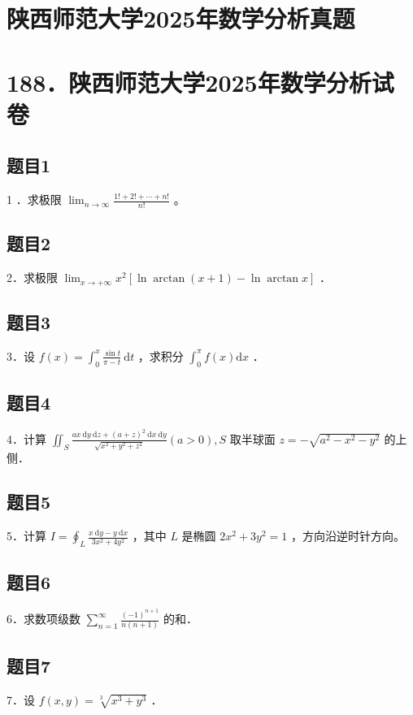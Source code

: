 \documentclass{article}
\begin{document}
\section*{陕西师范大学2025年数学分析真题}
\section*{188．陕西师范大学2025年数学分析试卷}

\subsection{题目1}
1 ．求极限 \(\lim _{n \rightarrow \infty} \frac{1!+2!+\cdots+n!}{n!}\) 。

\subsection{题目2}
2．求极限 \(\lim _{x \rightarrow+\infty} x^{2}[\ln \arctan (x+1)-\ln \arctan x]\) ．

\subsection{题目3}
3．设 \(f(x)=\int_{0}^{x} \frac{\sin t}{\pi-t} \mathrm{~d} t\) ，求积分 \(\int_{0}^{\pi} f(x) \mathrm{d} x\) ．

\subsection{题目4}
4．计算 \(\iint_{S} \frac{a x \mathrm{~d} y \mathrm{~d} z+(a+z)^{2} \mathrm{~d} x \mathrm{~d} y}{\sqrt{x^{2}+y^{2}+z^{2}}}(a>0), S\) 取半球面 \(z=-\sqrt{a^{2}-x^{2}-y^{2}}\) 的上侧．

\subsection{题目5}
5．计算 \(I=\oint_{L} \frac{x \mathrm{~d} y-y \mathrm{~d} x}{3 x^{2}+4 y^{2}}\) ，其中 \(L\) 是椭圆 \(2 x^{2}+3 y^{2}=1\) ，方向沿逆时针方向。

\subsection{题目6}
6．求数项级数 \(\sum_{n=1}^{\infty} \frac{(-1)^{n+1}}{n(n+1)}\) 的和．

\subsection{题目7}
7．设 \(f(x, y)=\sqrt[3]{x^{3}+y^{3}}\) ．
\end{document}
